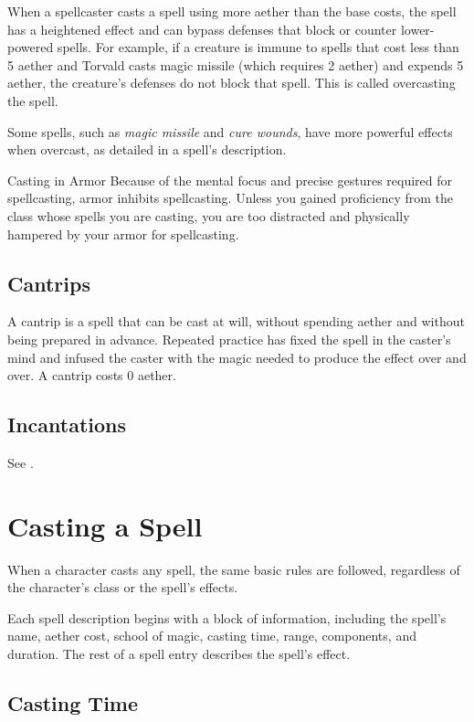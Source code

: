When a spellcaster casts a spell using more aether than the base costs, the spell has a heightened effect and can bypass defenses that block or counter lower-powered spells. For example, if a creature is immune to spells that cost less than 5 aether and Torvald casts magic missile (which requires 2 aether) and expends 5 aether, the creature's defenses do not block that spell. This is called overcasting the spell.

Some spells, such as \textit{magic missile} and \textit{cure wounds}, have more powerful effects when overcast, as detailed in a spell's description.

\begin{DndSidebar}{Casting in Armor}
    Because of the mental focus and precise gestures required for spellcasting, armor inhibits spellcasting. Unless you gained proficiency from the class whose spells you are casting, you are too distracted and physically hampered by your armor for spellcasting.
\end{DndSidebar}

\subsection{Cantrips}

A cantrip is a spell that can be cast at will, without spending aether and without being prepared in advance. Repeated practice has fixed the spell in the caster's mind and infused the caster with the magic needed to produce the effect over and over. A cantrip costs 0 aether.

\subsection{Incantations}
See .

\section{Casting a Spell}

When a character casts any spell, the same basic rules are followed, regardless of the character's class or the spell's effects.

Each spell description begins with a block of information, including the spell's name, aether cost, school of magic, casting time, range, components, and duration. The rest of a spell entry describes the spell's effect.

\subsection{Casting Time}

